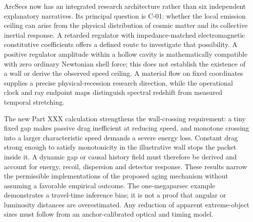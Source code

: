 \documentclass[
  11pt,
  twoside]{article}
\begin{document}
ArcSecs now has an integrated research architecture rather than six
independent explanatory narratives. Its principal question is C-01:
whether the local emission ceiling can arise from the physical
distribution of cosmic matter and its collective inertial response. A
retarded regulator with impedance-matched electromagnetic constitutive
coefficients offers a defined route to investigate that possibility. A
positive regulator amplitude within a hollow cavity is mathematically
compatible with zero ordinary Newtonian shell force; this does not
establish the existence of a wall or derive the observed speed ceiling.
A material flow on fixed coordinates supplies a precise
physical-recession research direction, while the operational clock and
ray endpoint maps distinguish spectral redshift from measured temporal
stretching.

The new Part XXX calculation strengthens the wall-crossing requirement:
a tiny fixed gap makes passive drag inefficient at reducing speed, and
monotone crossing into a larger characteristic speed demands a severe
energy loss. Constant drag strong enough to satisfy monotonicity in the
illustrative wall stops the packet inside it. A dynamic gap or causal
history field must therefore be derived and account for energy, recoil,
dispersion and detector response. These results narrow the permissible
implementations of the proposed aging mechanism without assuming a
favorable empirical outcome. The one-megaparsec example demonstrates a
travel-time inference bias; it is not a proof that angular or luminosity
distances are overestimated. Any reduction of apparent extreme-object
sizes must follow from an anchor-calibrated optical and timing model.
\end{document}
